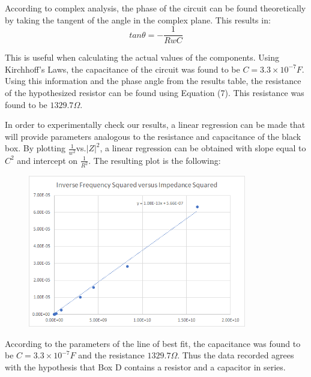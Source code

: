 \documentclass[a4paper]{article}
\begin{document}
According to complex analysis, the phase of the circuit can be found theoretically by taking the tangent of the angle in the complex plane. This results in:
\begin{equation}
tan{\theta}=-\frac{1}{RwC}
\end{equation}

This is useful when calculating the actual values of the components. Using Kirchhoff's Laws, the capacitance of the circuit was found to be $C=3.3\times10^{-7}F$.  Using this information and the phase angle from the results table, the resistance of the hypothesized resistor can be found using Equation (7). This resistance was found to be $1329.7\Omega$. 

In order to experimentally check our results, a linear regression can be made that will provide parameters analogous to the resistance and capacitance of the black box. By plotting $\frac{1}{w^2}$vs.$|Z|^{2}$, a linear regression can be obtained with slope equal to $C^2$ and intercept on $\frac{1}{R^{2}}$. The resulting plot is the following:
\clearpage
\begin{figure}[h]
\centering
\includegraphics[width=0.85\textwidth]{boxdlinear}
\end{figure}
According to the parameters of the line of best fit, the capacitance was found to be $C=3.3\times10^{-7}F$ and the resistance $1329.7\Omega$. Thus the data recorded agrees with the hypothesis that Box D contains a resistor and a capacitor in series.
\clearpage
\end{document}
